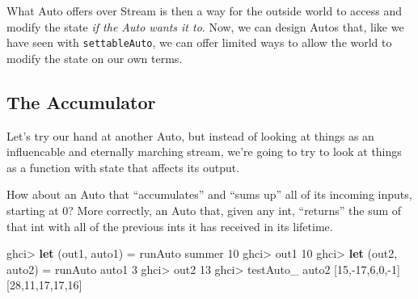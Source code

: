 \documentclass[]{article}
\newenvironment{Shaded}{}{}
\newcommand{\KeywordTok}[1]{\textcolor[rgb]{0.00,0.44,0.13}{\textbf{{#1}}}}
\newcommand{\DataTypeTok}[1]{\textcolor[rgb]{0.56,0.13,0.00}{{#1}}}
\newcommand{\DecValTok}[1]{\textcolor[rgb]{0.25,0.63,0.44}{{#1}}}
\newcommand{\CommentTok}[1]{\textcolor[rgb]{0.38,0.63,0.69}{\textit{{#1}}}}
\newcommand{\OtherTok}[1]{\textcolor[rgb]{0.00,0.44,0.13}{{#1}}}
\newcommand{\FunctionTok}[1]{\textcolor[rgb]{0.02,0.16,0.49}{{#1}}}
\newcommand{\NormalTok}[1]{{#1}}
\begin{document}
What Auto offers over Stream is then a way for the outside world to access and
modify the state \emph{if the Auto wants it to}. Now, we can design Autos that,
like we have seen with \texttt{settableAuto}, we can offer limited ways to allow
the world to modify the state on our own terms.

\subsection{The Accumulator}\label{the-accumulator}

Let's try our hand at another Auto, but instead of looking at things as an
influencable and eternally marching stream, we're going to try to look at things
as a function with state that affects its output.

How about an Auto that ``accumulates'' and ``sums up'' all of its incoming
inputs, starting at 0? More correctly, an Auto that, given any int, ``returns''
the sum of that int with all of the previous ints it has received in its
lifetime.

\begin{Shaded}
\end{Shaded}

\begin{Shaded}
\begin{Highlighting}[]
\NormalTok{ghci}\FunctionTok{>} \KeywordTok{let} \NormalTok{(out1, auto1) }\FunctionTok{=} \NormalTok{runAuto summer }\DecValTok{10}
\NormalTok{ghci}\FunctionTok{>} \NormalTok{out1}
\DecValTok{10}
\NormalTok{ghci}\FunctionTok{>} \KeywordTok{let} \NormalTok{(out2, auto2) }\FunctionTok{=} \NormalTok{runAuto auto1 }\DecValTok{3}
\NormalTok{ghci}\FunctionTok{>} \NormalTok{out2}
\DecValTok{13}
\NormalTok{ghci}\FunctionTok{>} \NormalTok{testAuto_ auto2 [}\DecValTok{15}\NormalTok{,}\FunctionTok{-}\DecValTok{17}\NormalTok{,}\DecValTok{6}\NormalTok{,}\DecValTok{0}\NormalTok{,}\FunctionTok{-}\DecValTok{1}\NormalTok{]}
\NormalTok{[}\DecValTok{28}\NormalTok{,}\DecValTok{11}\NormalTok{,}\DecValTok{17}\NormalTok{,}\DecValTok{17}\NormalTok{,}\DecValTok{16}\NormalTok{]}
\end{Highlighting}
\end{Shaded}
\end{document}
